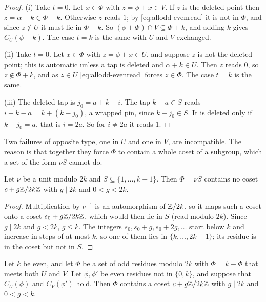 \begin{proof}
(i) Take $t=0$. Let $x\in \Phi$ with $z=\phi+x\in V$. If $z$ is the deleted point
then $z=\alpha+k\in \Phi+k$. Otherwise $z$ reads $1$; by
\eqref{eq:allodd-evenread} it is not in $\Phi$, and since $z\notin U$ it must lie
in $\Phi+k$. So $(\phi+\Phi)\cap V\subseteq \Phi+k$, and adding $k$ gives
$C_U(\phi+k)$. The case $t=k$ is the same with $U$ and $V$ exchanged.

(ii) Take $t=0$. Let $x\in \Phi$ with $z=\phi+x\in U$, and suppose $z$ is not
the deleted point; this is automatic unless a tap is deleted and
$\alpha+k\in U$. Then $z$ reads $0$, so $z\notin \Phi+k$, and as $z\in U$
\eqref{eq:allodd-evenread} forces $z\in \Phi$. The case $t=k$ is the same.

(iii) The deleted tap is $j_0=a+k-i$. The tap $k-a\in S$ reads
$i+k-a=k+(k-j_0)$, a wrapped pin, since $k-j_0\in S$. It is deleted only if
$k-j_0=a$, that is $i=2a$. So for $i\ne2a$ it reads $1$.
\end{proof}

Two failures of opposite type, one in $U$ and one in $V$, are incompatible. The
reason is that together they force $\Phi$ to contain a whole coset of a
subgroup, which a set of the form $\nu S$ cannot do.

\begin{lemma}[no coset]
\label{lem:allodd-nocoset}
Let $\nu$ be a unit modulo $2k$ and $S\subseteq\{1,\dots,k-1\}$. Then $\Phi=\nu S$
contains no coset $c+g\mathbb{Z}/2k\mathbb{Z}$ with $g\mid2k$ and $0<g<2k$.
\end{lemma}

\begin{proof}
Multiplication by $\nu^{-1}$ is an automorphism of $\mathbb{Z}/2k$, so it maps such a
coset onto a coset $s_0+g\mathbb{Z}/2k\mathbb{Z}$, which would then lie in $S$ (read modulo
$2k$). Since $g\mid 2k$ and $g<2k$, $g\le k$. The integers $s_0,s_0+g,
s_0+2g,\dots$ start below $k$ and increase in steps of at most $k$, so one of
them lies in $\{k,\dots,2k-1\}$; its residue is in the coset but not in $S$.
\end{proof}

\begin{lemma}
\label{lem:allodd-cosetfail}
Let $k$ be even, and let $\Phi$ be a set of odd residues modulo $2k$ with
$\Phi=k-\Phi$ that meets both $U$ and $V$. Let $\phi,\phi'$ be even residues not in
$\{0,k\}$, and suppose that $C_U(\phi)$ and $C_V(\phi')$ hold. Then $\Phi$
contains a coset $c+g\mathbb{Z}/2k\mathbb{Z}$ with $g\mid 2k$ and $0<g<k$.
\end{lemma}

